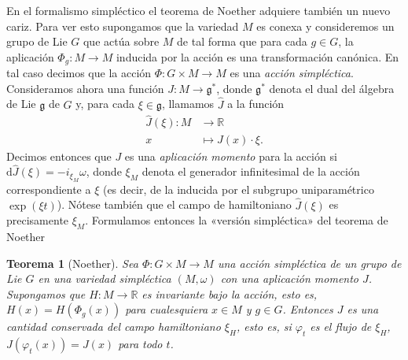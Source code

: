 \documentclass[12pt,a4paper,twoside]{article}
\newtheorem{thm}{Teorema}[section]
\theoremstyle{definition} \newtheorem{defn}[thm]{Definición}
\theoremstyle{definition} \newtheorem{ejemplo}[thm]{Ejemplo}
\theoremstyle{definition} \newtheorem{ejercicio}[thm]{Ejercicio}
\theoremstyle{remark} \newtheorem*{obs}{Observación}
\def\RR{\mathbb{R}}
\def\dd{\mathrm{d}}
\def\gg{\mathfrak{g}}
\begin{document}
En el formalismo simpléctico el teorema de Noether adquiere también un nuevo cariz. Para ver esto supongamos que la variedad $M$ es conexa y consideremos un grupo de Lie $G$ que actúa sobre $M$ de tal forma que para cada $g\in G$, la aplicación $\Phi_g:M\rightarrow M$ inducida por la acción es una transformación canónica. En tal caso decimos que la acción $\Phi:G\times M\rightarrow M$ es una \emph{acción simpléctica}. Consideramos ahora una función $J:M\rightarrow \gg^*$, donde $\gg^*$ denota el dual del álgebra de Lie $\gg$ de $G$ y, para cada $\xi\in \gg$, llamamos $\hat{J}$ a la función
\begin{align*}
  \hat{J}(\xi) :M&\longrightarrow \RR\\ 
     x &\longmapsto J(x)\cdot \xi.
  \end{align*}
  Decimos entonces que $J$ es una \emph{aplicación momento} para la acción si $\dd \hat{J}(\xi)=-i_{\xi_M}\omega$, donde $\xi_M$ denota el generador infinitesimal de la acción correspondiente a $\xi$ (es decir, de la inducida por el subgrupo uniparamétrico $\exp(\xi t)$). Nótese también que el campo de hamiltoniano $\hat{J}(\xi)$ es precisamente $\xi_M$. Formulamos entonces la «versión simpléctica» del teorema de Noether 
  \begin{thm}[Noether]
    Sea $\Phi:G\times M \rightarrow M$ una acción simpléctica de un grupo de Lie $G$ en una variedad simpléctica $(M,\omega)$ con una aplicación momento $J$. Supongamos que $H:M\rightarrow \RR$ es invariante bajo la acción, esto es, $H(x)=H(\Phi_g(x))$ para cualesquiera $x\in M$ y $g\in G$. Entonces $J$ es una cantidad conservada del campo hamiltoniano $\xi_H$, esto es, si $\varphi_t$ es el flujo de $\xi_H$, $J(\varphi_t(x))=J(x)$ para todo $t$.
  \end{thm}
\end{document}

